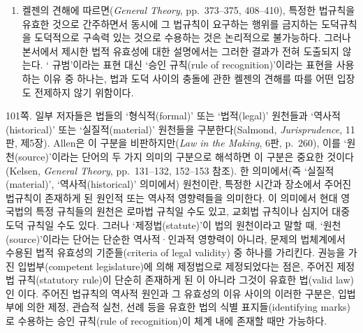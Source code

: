 {\begin{enumerate}
  규칙이 존재한다고 말하는 것은 불필요한 중복처럼 보인다. 특히, 영국처럼
  성문 헌법이 존재하지 않는 경우에는 더욱 그렇다. 이 경우, 법을 식별할
  때 특정한 유효성 기준들, 예컨대 의회 내 여왕에 의한 제정이 사용되어야
  한다는 규칙에 덧붙여 ‘헌법에 복종해야 한다’는 규칙이 자리할 곳은 없어
  보인다. 이 규칙 자체가 수용된 규칙이며, 이 규칙에 복종해야 한다는
  규칙을 말하는 것은 신비화할 뿐이다.
\item
  켈젠의 견해에 따르면(\emph{General Theory}, pp.~373--375, 408--410),
  특정한 법규칙을 유효한 것으로 간주하면서 동시에 그 법규칙이 요구하는
  행위를 금지하는 도덕규칙을 도덕적으로 구속력 있는 것으로 수용하는 것은
  논리적으로 불가능하다. 그러나 본서에서 제시한 법적 유효성에 대한
  설명에서는 그러한 결과가 전혀 도출되지 않는다. ‘
  규범’이라는 표현 대신 ‘승인 규칙(rule of recognition)’이라는 표현을
  사용하는 이유 중 하나는, 법과 도덕 사이의 충돌에 관한 켈젠의 견해를
  따를 어떤 입장도 전제하지 않기 위함이다.
\end{enumerate}

\noteentry 101쪽.  일부 저자들은 법들의
‘형식적(formal)’ 또는 ‘법적(legal)’ 원천들과 ‘역사적(historical)’ 또는
‘실질적(material)’ 원천들을 구분한다(Salmond, \emph{Jurisprudence},
11판, 제5장). Allen은 이 구분을 비판하지만(\emph{Law in the Making},
6판, p.~260), 이를 ‘원천(source)’이라는 단어의 두 가지 의미의 구분으로
해석하면 이 구분은 중요한 것이다(Kelsen, \emph{General Theory},
pp.~131--132, 152--153 참조). 한 의미에서(즉 ‘실질적(material)’,
‘역사적(historical)’ 의미에서) 원천이란, 특정한 시간과 장소에서 주어진
법규칙이 존재하게 된 원인적 또는 역사적 영향력들을 의미한다. 이 의미에서
현대 영국법의 특정 규칙들의 원천은 로마법 규칙일 수도 있고, 교회법
규칙이나 심지어 대중 도덕 규칙일 수도 있다. 그러나 ‘제정법(statute)’이
법의 원천이라고 말할 때, ‘원천(source)’이라는 단어는 단순한
역사적·인과적 영향력이 아니라, 문제의 법체계에서 수용된 법적 유효성의
기준들(criteria of legal validity) 중 하나를 가리킨다. 권능을 가진
입법부(competent legislature)에 의해 제정법으로 제정되었다는 점은,
주어진 제정법 규칙(statutory rule)이 단순히 존재하게 된
이 아니라 그것이 유효한 법(valid law)인
이다. 주어진 법규칙의 역사적 원인과 그 유효성의 이유
사이의 이러한 구분은, 입법부에 의한 제정, 관습적 실천, 선례 등을 유효한
법의 식별 표지들(identifying marks)로 수용하는 승인 규칙(rule of
recognition)이 체계 내에 존재할 때만 가능하다.

}
